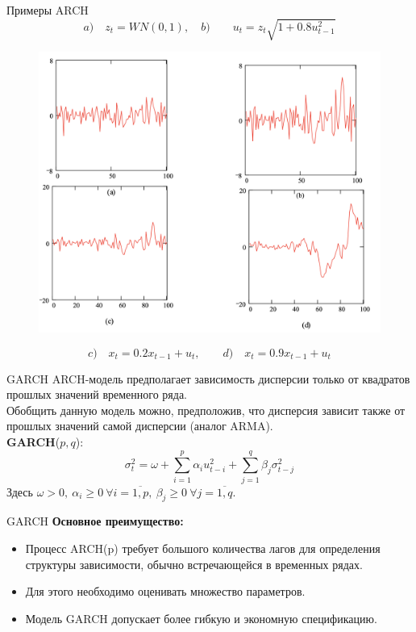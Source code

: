 \begin{frame}{Примеры ARCH}
$$a)\quad z_t = WN(0,1),\quad b)\quad \quad u_t = z_t\sqrt{1 + 0.8u_{t-1}^2}$$
\begin{figure}
    \centering
    \includegraphics[width=0.7\linewidth]{lecture_3/fig/arch_example.png}
\end{figure}
$$c)\quad x_t = 0.2x_{t-1} + u_t,\quad \quad d)\quad x_t = 0.9x_{t-1} + u_t$$
\end{frame}
\begin{frame}{GARCH}
ARCH-модель предполагает зависимость дисперсии только от квадратов прошлых значений временного ряда.\\
\vspace{0.3cm}
Обобщить данную модель можно, предположив, что дисперсия зависит также от прошлых значений самой дисперсии (аналог ARMA).\\
\vspace{0.3cm}
\textbf{GARCH}($p, q$):
$$ \sigma_t^2 = \omega + \sum_{i=1}^p \alpha_i u_{t-i}^2 + \sum_{j=1}^q \beta_j \sigma_{t-j}^2$$
Здесь $\omega > 0, \ \alpha_i \geq 0 \ \forall i = \overline{1, p}, \ \beta_j \geq 0 \ \forall j = \overline{1, q}$. 
\end{frame}
\begin{frame}{GARCH}
\textbf{Основное преимущество:}
\begin{itemize}
\item Процесс ARCH(p) требует большого количества лагов для определения структуры зависимости, обычно встречающейся в  временных рядах.
\item Для этого необходимо оценивать множество параметров.
\item Модель GARCH допускает более гибкую и экономную спецификацию.
\end{itemize}
\end{frame}
